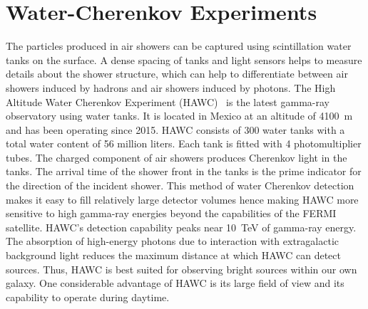 \section{Water-Cherenkov Experiments}
The particles produced in air showers can be captured using scintillation water tanks on the surface.
A dense spacing of tanks and light sensors helps to measure details about the shower structure, which can help to differentiate
between air showers induced by hadrons and air showers induced by photons.
The High Altitude Water Cherenkov Experiment (HAWC)~\cite{hawc} is the latest gamma-ray observatory using
water tanks. It is located in Mexico at an altitude of \SI{4100}{\metre} and has been operating since 2015.
HAWC consists of 300 water tanks with a total water content of 56 million liters. Each tank is fitted with 4 photomultiplier tubes.
The charged component of air showers produces Cherenkov light in the tanks. The arrival time of the shower front in the tanks
is the prime indicator for the direction of the incident shower. This method of water Cherenkov detection makes it easy
to fill relatively large detector volumes hence making HAWC more sensitive to high gamma-ray energies beyond
the capabilities of the FERMI satellite. 
HAWC's detection capability peaks near \SI{10}{TeV} of gamma-ray energy.
The absorption of high-energy photons due to interaction with extragalactic background light reduces the maximum distance at which HAWC can detect sources.
Thus, HAWC is best suited for observing bright sources within our own galaxy.
One considerable advantage of HAWC is its large field of view and its capability to operate during daytime.

